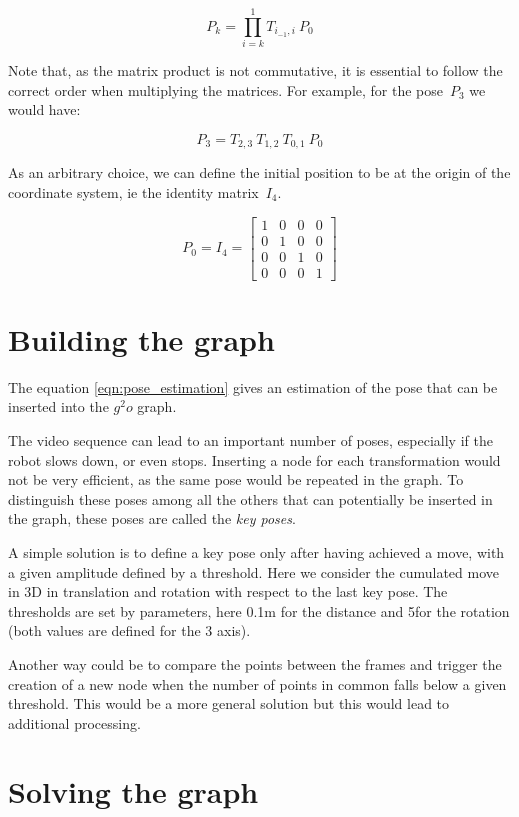 \begin{equation}
P_k = \prod_{i=k}^1{T_{i_{-1},i}} \: P_0
\label{eqn:pose_estimation}
\end{equation}

Note that, as the matrix product is not commutative, it is essential to follow the correct order when multiplying the matrices. For example, for the pose~$P_3$ we would have:

\[
P_3 = T_{2,3} \: T_{1,2} \: T_{0,1} \: P_0
\]

As an arbitrary choice, we can define the initial position to be at the origin of the coordinate system, ie the identity matrix~$I_4$.

\[
P_0 = I_4 = \left[ \begin{array}{cccc}
1 & 0 & 0 & 0 \\
0 & 1 & 0 & 0 \\
0 & 0 & 1 & 0 \\
0 & 0 & 0 & 1 \end{array} \right] 
\]

\section{Building the graph}

The equation \ref{eqn:pose_estimation} gives an estimation of the pose that can be inserted into the $g^2o$ graph.

The video sequence can lead to an important number of poses, especially if the robot slows down, or even stops. Inserting a node for each transformation would not be very efficient, as the same pose would be repeated in the graph. To distinguish these poses among all the others that can potentially be inserted in the graph, these poses are called the \emph{key poses}. 

A simple solution is to define a key pose only after having achieved a move, with a given amplitude defined by a threshold. Here we consider the cumulated move in 3D in translation and rotation with respect to the last key pose. The thresholds are set by parameters, here 0.1m for the distance and 5\textdegree for the rotation (both values are defined for the 3 axis).

Another way could be to compare the points between the frames and trigger the creation of a new node when the number of points in common falls below a given threshold. This would be a more general solution but this would lead to additional processing.

\section{Solving the graph}


